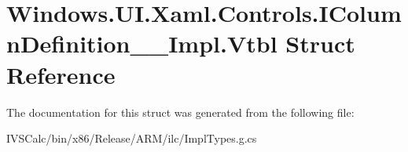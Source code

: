 \hypertarget{struct_windows_1_1_u_i_1_1_xaml_1_1_controls_1_1_i_column_definition_____impl_1_1_vtbl}{}\section{Windows.\+U\+I.\+Xaml.\+Controls.\+I\+Column\+Definition\+\_\+\+\_\+\+Impl.\+Vtbl Struct Reference}
\label{struct_windows_1_1_u_i_1_1_xaml_1_1_controls_1_1_i_column_definition_____impl_1_1_vtbl}


The documentation for this struct was generated from the following file\+:\begin{DoxyCompactItemize}
\item 
I\+V\+S\+Calc/bin/x86/\+Release/\+A\+R\+M/ilc/Impl\+Types.\+g.\+cs\end{DoxyCompactItemize}
